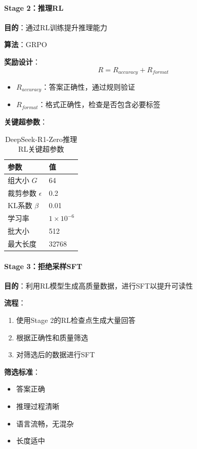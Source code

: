 \documentclass[12pt,a4paper]{article}
\begin{document}
\paragraph{Stage 2：推理RL}

\textbf{目的}：通过RL训练提升推理能力

\textbf{算法}：GRPO

\textbf{奖励设计}：
\begin{equation}
R = R_{accuracy} + R_{format}
\end{equation}

\begin{itemize}
    \item $R_{accuracy}$：答案正确性，通过规则验证
    \item $R_{format}$：格式正确性，检查是否包含必要标签
\end{itemize}

\textbf{关键超参数}：
\begin{table}[H]
\centering
\caption{DeepSeek-R1-Zero推理RL关键超参数}
\begin{tabular}{ll}
\toprule
\textbf{参数} & \textbf{值} \\
\midrule
组大小 $G$ & 64 \\
裁剪参数 $\epsilon$ & 0.2 \\
KL系数 $\beta$ & 0.01 \\
学习率 & $1 \times 10^{-6}$ \\
批大小 & 512 \\
最大长度 & 32768 \\
\bottomrule
\end{tabular}
\end{table}

\paragraph{Stage 3：拒绝采样SFT}

\textbf{目的}：利用RL模型生成高质量数据，进行SFT以提升可读性

\textbf{流程}：
\begin{enumerate}
    \item 使用Stage 2的RL检查点生成大量回答
    \item 根据正确性和质量筛选
    \item 对筛选后的数据进行SFT
\end{enumerate}

\textbf{筛选标准}：
\begin{itemize}
    \item 答案正确
    \item 推理过程清晰
    \item 语言流畅，无混杂
    \item 长度适中
\end{itemize}
\end{document}

